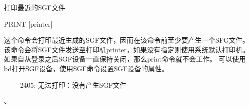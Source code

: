 \label{cmd:print}

打印最近的SGF文件

\begin{SACSTX}
PRINT [printer]
\end{SACSTX}

这个命令会打印最近生成的SGF文件，因而在该命令前至少要产生一个SFG文件。
该命令会将SGF文件发送至打印机printer，如果没有指定则使用系统默认打印机。
如果自从登录之后SGF设备一直保持关闭，那么print命令就不会工作。
可以使用bd打开SGF设备，使用SGF命令设置SGF设备的属性。

\begin{itemize}
\item[-]2405: 无法打印：没有产生SGF文件
\end{itemize}

、
